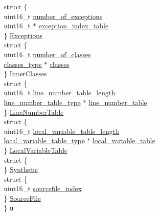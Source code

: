 \begin{DoxyCompactItemize}
\begin{tabbing}
\>struct \{\\
\>\>uint16\_t \hyperlink{structattribute__info_a7c0c2c58d833f7b63d0b6ab483e537f1}{number\_of\_exceptions}\\
\>\>uint16\_t $\ast$ \hyperlink{structattribute__info_a38178aee6eed0ea3d063727fed9cd100}{exception\_index\_table}\\
\>\} \hyperlink{structattribute__info_a4fc210f2d621b426637fb3a32e0783c0}{Exceptions}\\
\>struct \{\\
\>\>uint16\_t \hyperlink{structattribute__info_acf309770753a9a9e7cf0b91fb4dd45db}{number\_of\_classes}\\
\>\>\hyperlink{structclasses__type}{classes\_type} $\ast$ \hyperlink{structattribute__info_a65d85b8eb6a1f28360c9795ed98de13c}{classes}\\
\>\} \hyperlink{structattribute__info_a8b040beab0320ec8804cb3e640127a39}{InnerClasses}\\
\>struct \{\\
\>\>uint16\_t \hyperlink{structattribute__info_a81109c88e53b847e840ca2672b12700b}{line\_number\_table\_length}\\
\>\>\hyperlink{structline__number__table__type}{line\_number\_table\_type} $\ast$ \hyperlink{structattribute__info_aa4dba0207d2338202400c3860f5f6cbb}{line\_number\_table}\\
\>\} \hyperlink{structattribute__info_af6b14486315fa8c2d5b49b82e209c9aa}{LineNumberTable}\\
\>struct \{\\
\>\>uint16\_t \hyperlink{structattribute__info_a213dab40b46591df77874456f17d9282}{local\_variable\_table\_length}\\
\>\>\hyperlink{structlocal__variable__table__type}{local\_variable\_table\_type} $\ast$ \hyperlink{structattribute__info_aa3c58444ef5605c7dc24c82b3c76e7df}{local\_variable\_table}\\
\>\} \hyperlink{structattribute__info_a14fc812933da9d00004f2a85195ec991}{LocalVariableTable}\\
\>struct \{\\
\>\} \hyperlink{structattribute__info_a586a93df7c9a2b39e5b71d7b74817e78}{Synthetic}\\
\>struct \{\\
\>\>uint16\_t \hyperlink{structattribute__info_a9e5e8288eaa9f8649a0380fe8ae3056f}{sourcefile\_index}\\
\>\} \hyperlink{structattribute__info_a19be8f9c59a8338514cb47f8a654335d}{SourceFile}\\
\} \hyperlink{structattribute__info_ad6c58ccdd200eb05a9e2c1d34b624530}{u}\\

\end{tabbing}\end{DoxyCompactItemize}



